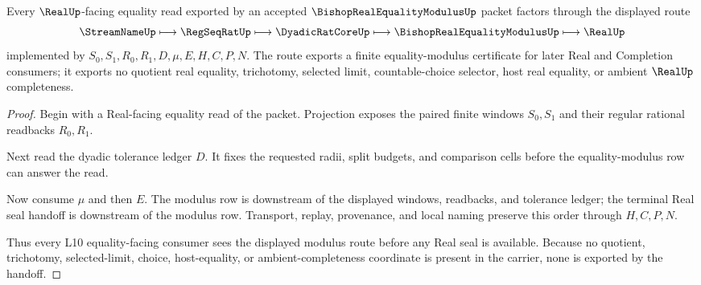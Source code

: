 \begin{theorem}
\label{thm:bishop-real-equality-modulus-l10-handoff}
Every $\RealUp$-facing equality read exported by an accepted $\BishopRealEqualityModulusUp$ packet factors through the displayed route
$$
\StreamNameUp \longmapsto \RegSeqRatUp \longmapsto \DyadicRatCoreUp \longmapsto \BishopRealEqualityModulusUp \longmapsto \RealUp
$$
implemented by $S_0,S_1,R_0,R_1,D,\mu,E,H,C,P,N$. The route exports a finite equality-modulus certificate for later Real and Completion consumers; it exports no quotient real equality, trichotomy, selected limit, countable-choice selector, host real equality, or ambient $\RealUp$ completeness.
\end{theorem}
\begin{proof}
Begin with a Real-facing equality read of the packet. Projection exposes the paired finite windows $S_0,S_1$ and their regular rational readbacks $R_0,R_1$.

Next read the dyadic tolerance ledger $D$. It fixes the requested radii, split budgets, and comparison cells before the equality-modulus row can answer the read.

Now consume $\mu$ and then $E$. The modulus row is downstream of the displayed windows, readbacks, and tolerance ledger; the terminal Real seal handoff is downstream of the modulus row. Transport, replay, provenance, and local naming preserve this order through $H,C,P,N$.

Thus every L10 equality-facing consumer sees the displayed modulus route before any Real seal is available. Because no quotient, trichotomy, selected-limit, choice, host-equality, or ambient-completeness coordinate is present in the carrier, none is exported by the handoff.
\end{proof}



